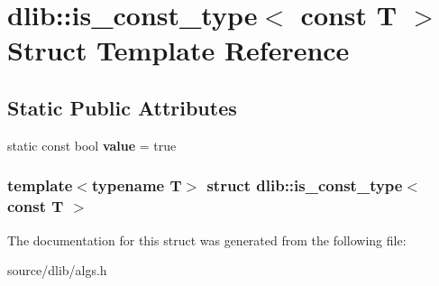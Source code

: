 \hypertarget{structdlib_1_1is__const__type_3_01const_01T_01_4}{
\section{dlib::is\_\-const\_\-type$<$ const T $>$ Struct Template Reference}
\label{structdlib_1_1is__const__type_3_01const_01T_01_4}
}
\subsection*{Static Public Attributes}
\begin{DoxyCompactItemize}
\item 
\hypertarget{structdlib_1_1is__const__type_3_01const_01T_01_4_a0c17deca2de4f4b4ecf81cd955869640}{
static const bool {\bfseries value} = true}
\label{structdlib_1_1is__const__type_3_01const_01T_01_4_a0c17deca2de4f4b4ecf81cd955869640}

\end{DoxyCompactItemize}
\subsubsection*{template$<$typename T$>$ struct dlib::is\_\-const\_\-type$<$ const T $>$}



The documentation for this struct was generated from the following file:\begin{DoxyCompactItemize}
\item 
source/dlib/algs.h\end{DoxyCompactItemize}
